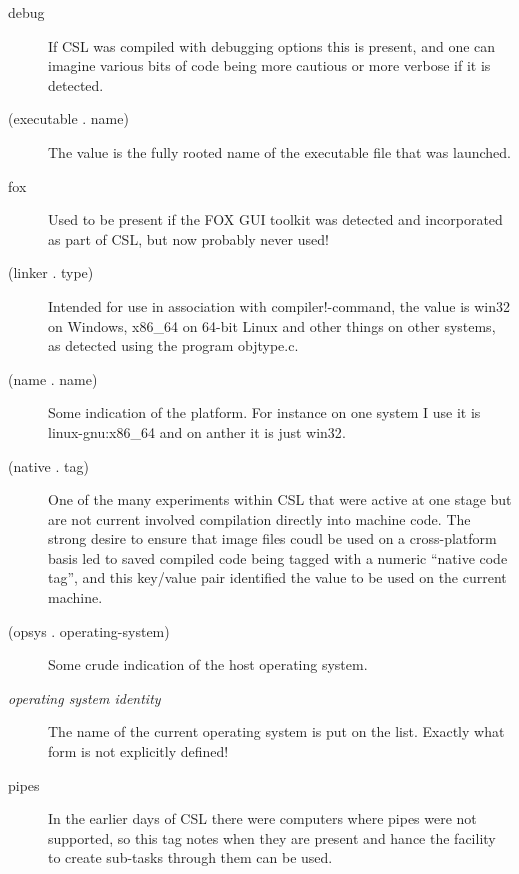 \documentclass[a4paper,11pt]{article}
\begin{document}
\begin{description}
\item[{\ttfamily debug}] 
If CSL was compiled with debugging options this is present, and one can imagine
various bits of code being more cautious or more verbose if it is detected.

\item[{\ttfamily  (executable . name)}] 
The value is the fully rooted name of the executable file that was launched.

\item[{\ttfamily fox}] 
Used to be present if the FOX GUI toolkit was detected and incorporated as
part of CSL, but now probably never used!

\item[{\ttfamily (linker . type)}] 
Intended for use in association with {\ttfamily compiler!-command}, the value
is {\ttfamily win32} on Windows, {\ttfamily x86\_64} on 64-bit Linux and
other things on other systems, as detected using the program {\ttfamily
objtype.c}.

\item[{\ttfamily  (name . name)}] 
Some indication of the platform. For instance on one system I use it
is {\ttfamily linux-gnu:x86\_64} and on anther it is just {\ttfamily win32}.

\item[{\ttfamily  (native . tag)}] 
One of the many experiments within CSL that were active at one stage but are
not current involved compilation directly into machine code. The strong
desire to ensure that image files coudl be used on a cross-platform basis
led to saved compiled code being tagged with a numeric ``native code tag'',
and this key/value pair identified the value to be used on the current
machine.

\item[{\ttfamily  (opsys . operating-system)}] 
Some crude indication of the host operating system.

\item [{\itshape operating system identity}] 
The name of the current operating system is put on the list. Exactly what
form is not explicitly defined!

\item[{\ttfamily pipes}] 
In the earlier days of CSL there were computers where pipes were not
supported, so this tag notes when they are present and hance the facility
to create sub-tasks through them can be used.


\end{description}
\end{document}
